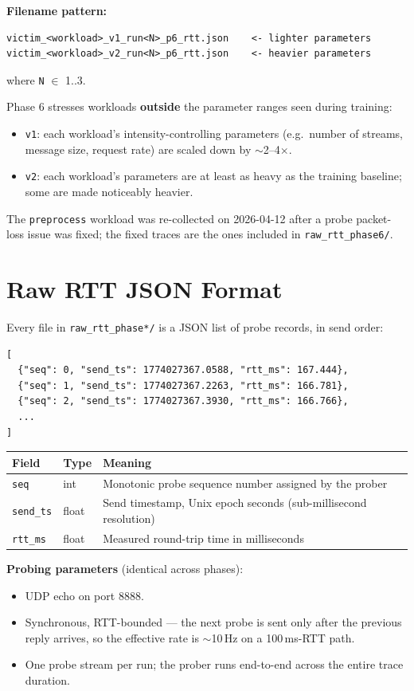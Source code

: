 \documentclass[11pt,a4paper]{article}
\begin{document}
\textbf{Filename pattern:}
\begin{lstlisting}
victim_<workload>_v1_run<N>_p6_rtt.json    <- lighter parameters
victim_<workload>_v2_run<N>_p6_rtt.json    <- heavier parameters
\end{lstlisting}
where \texttt{N} $\in$ 1..3.

Phase 6 stresses workloads \textbf{outside} the parameter ranges seen during
training:
\begin{itemize}[leftmargin=*]
  \item \texttt{v1}: each workload's intensity-controlling parameters
        (e.g.\ number of streams, message size, request rate) are scaled down
        by $\sim$2--4$\times$.
  \item \texttt{v2}: each workload's parameters are at least as heavy as the
        training baseline; some are made noticeably heavier.
\end{itemize}

The \texttt{preprocess} workload was re-collected on 2026-04-12 after a probe
packet-loss issue was fixed; the fixed traces are the ones included in
\texttt{raw\_rtt\_phase6/}.

\section{Raw RTT JSON Format}

Every file in \texttt{raw\_rtt\_phase*/} is a JSON list of probe records, in
send order:

\begin{lstlisting}
[
  {"seq": 0, "send_ts": 1774027367.0588, "rtt_ms": 167.444},
  {"seq": 1, "send_ts": 1774027367.2263, "rtt_ms": 166.781},
  {"seq": 2, "send_ts": 1774027367.3930, "rtt_ms": 166.766},
  ...
]
\end{lstlisting}

\begin{tabular}{@{}llp{9cm}@{}}
\toprule
\textbf{Field} & \textbf{Type} & \textbf{Meaning} \\
\midrule
\texttt{seq}     & int   & Monotonic probe sequence number assigned by the prober \\
\texttt{send\_ts}& float & Send timestamp, Unix epoch seconds (sub-millisecond resolution) \\
\texttt{rtt\_ms} & float & Measured round-trip time in milliseconds \\
\bottomrule
\end{tabular}

\textbf{Probing parameters} (identical across phases):
\begin{itemize}[leftmargin=*]
  \item UDP echo on port 8888.
  \item Synchronous, RTT-bounded --- the next probe is sent only after the
        previous reply arrives, so the effective rate is $\sim$10\,Hz on a
        100\,ms-RTT path.
  \item One probe stream per run; the prober runs end-to-end across the
        entire trace duration.
\end{itemize}
\end{document}
